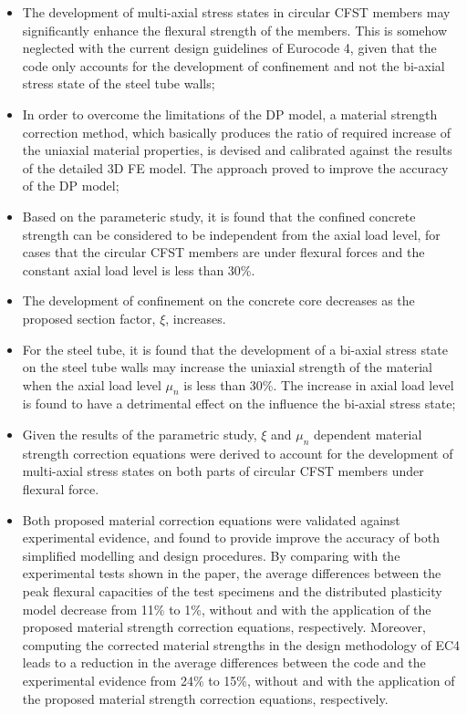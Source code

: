 \documentclass[12pt,a4]{article}
\begin{document}
	\begin{itemize}
		\item The development of multi-axial stress states in circular CFST members may significantly enhance the flexural strength of the members. This is somehow neglected with the current design guidelines of Eurocode 4, given that the code only accounts for the development of confinement and not the bi-axial stress state of the steel tube walls;
		
		\item In order to overcome the limitations of the DP model, a material strength correction method, which basically produces the ratio of required increase of the uniaxial material properties, is devised and calibrated against the results of the detailed 3D FE model. The approach proved to improve the accuracy of the DP model;
		
		\item Based on the parameteric study, it is found that the confined concrete strength can be considered to be independent from the axial load level, for cases that the circular CFST members are under flexural forces and the constant axial load level is less than 30\%.
		
		\item The development of confinement on the concrete core decreases as the proposed section factor, $ξ$, increases.
		
		\item For the steel tube, it is found that the development of a bi-axial stress state on the steel tube walls may increase the uniaxial strength of the material when the axial load level $μ_n$ is less than 30\%. The increase in axial load level is found to have a detrimental effect on the influence the bi-axial stress state;
		
		\item Given the results of the parametric study, $ξ$ and $μ_n$ dependent material strength correction equations were derived to account for the development of multi-axial stress states on both parts of circular CFST members under flexural force.
		
		\item Both proposed material correction equations were validated against experimental evidence, and found to provide improve the accuracy of both simplified modelling and design procedures. By comparing with the experimental tests shown in the paper, the average differences between the peak flexural capacities of the test specimens and the distributed plasticity model decrease from 11\% to 1\%, without and with the application of the proposed material strength correction equations, respectively. Moreover, computing the corrected material strengths in the design methodology of EC4 leads to a reduction in the average differences between the code and the experimental evidence from 24\% to 15\%, without and with the application of the proposed material strength correction equations, respectively.
	\end{itemize}
	
	
	
	
	
	
	
\end{document}

